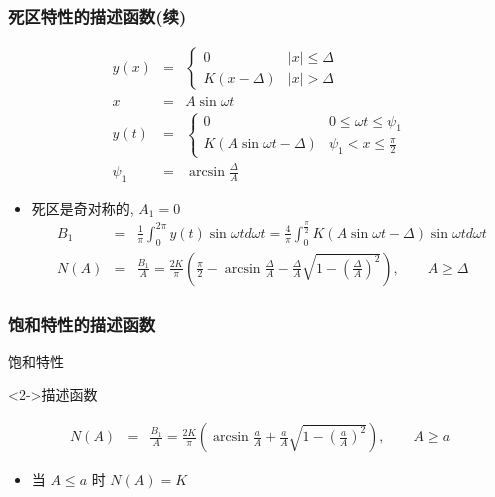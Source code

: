\documentclass[table]{beamer}
\begin{document}
\begin{frame}
\frametitle{死区特性的描述函数(续)}
\label{sec-2-2}

\begin{eqnarray*}
y(x) & = &\begin{cases} 
0  &  |x| \leq \Delta \\
K(x-\Delta)  & |x|>\Delta   \end{cases} \\
x &=& A\sin\omega t \\
y(t) &=& \begin{cases} 
0  &  0\leq \omega t \leq \psi_1 \\
K(A\sin\omega t-\Delta)  & \psi_1 < x \leq \frac{\pi}{2}   \end{cases} \\
\psi_1 &=& \arcsin\frac{\Delta}{A}
\end{eqnarray*}
\begin{itemize}
\item <2-> 死区是奇对称的,  $A_1 = 0$
      \begin{eqnarray*}
      B_1 &=& \frac{1}{\pi}\int_0^{2\pi}y(t)\sin\omega t d\omega t 
           =  \frac{4}{\pi}\int_0^{\frac{\pi}{2}}K(A\sin\omega t -\Delta)\sin\omega t d\omega t \\
      N(A)&=&  \frac{B_1}{A} =\frac{2K}{\pi}\left(\frac{\pi}{2}-\arcsin\frac{\Delta}{A}-\frac{\Delta}{A}\sqrt{1-(\frac{\Delta}{A})^2}\right),\qquad A\geq\Delta
      \end{eqnarray*}
\end{itemize}
\end{frame}
\begin{frame}
\frametitle{饱和特性的描述函数}
\label{sec-2-3}
\begin{block}{饱和特性}
\label{sec-2-3-1}

\end{block}
\begin{block}<2->{描述函数}
\label{sec-2-3-2}


\begin{eqnarray*}
N(A) &=& \frac{B_1}{A} 
      =   \frac{2K}{\pi}\left(\arcsin\frac{a}{A}+\frac{a}{A}\sqrt{1-(\frac{a}{A})^2}\right) ,\qquad A\geq a 
\end{eqnarray*}
\begin{itemize}
\item <3->当  $A\leq a$  时  $N(A)=K$
\end{itemize}
\end{block}
\end{frame}
\end{document}
